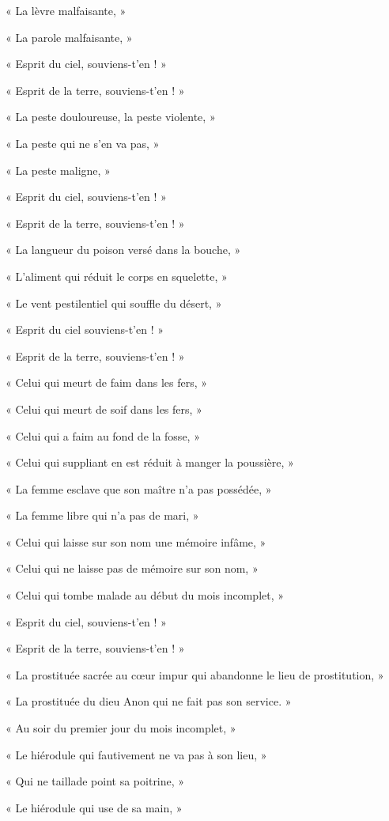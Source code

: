 \documentclass[a4paper, 11pt, oneside, polutonikogreek, french]{article}
\begin{document}
« La lèvre malfaisante, »

« La parole malfaisante, »

« Esprit du ciel, souviens-t'en ! »

« Esprit de la terre, souviens-t'en ! »

« La peste douloureuse, la peste violente, »

« La peste qui ne s'en va pas, »

« La peste maligne, »

« Esprit du ciel, souviens-t'en ! »

« Esprit de la terre, souviens-t'en ! »

« La langueur du poison versé dans la bouche, »

« L'aliment qui réduit le corps en squelette, »

« Le vent pestilentiel qui souffle du désert, »

« Esprit du ciel souviens-t'en ! »

« Esprit de la terre, souviens-t'en ! »

« Celui qui meurt de faim dans les fers, »

« Celui qui meurt de soif dans les fers, »

« Celui qui a faim au fond de la fosse, »

« Celui qui suppliant en est réduit à manger la poussière, »

« La femme esclave que son maître n'a pas possédée, »

« La femme libre qui n'a pas de mari, »

« Celui qui laisse sur son nom une mémoire infâme, »

« Celui qui ne laisse pas de mémoire sur son nom, »

« Celui qui tombe malade au début du mois incomplet, »

« Esprit du ciel, souviens-t'en ! »

« Esprit de la terre, souviens-t'en ! »

« La prostituée sacrée au cœur impur qui abandonne le lieu de prostitution, »

« La prostituée du dieu Anon qui ne fait pas son service. »

« Au soir du premier jour du mois incomplet, »

« Le hiérodule qui fautivement ne va pas à son lieu, »

« Qui ne taillade point sa poitrine, »

« Le hiérodule qui use de sa main, »
\end{document}
